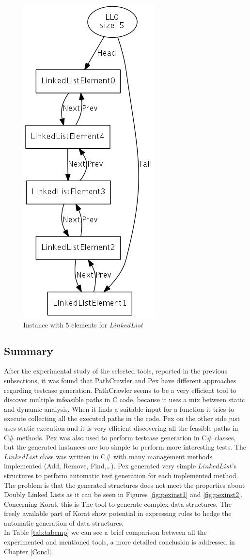 \begin{figure}[!ht]
\center \includegraphics[width=.3\textwidth]{images/ll2}
\caption{Instance with $5$ elements for $LinkedList$}
\label{fig:inst2}
\end{figure}

\subsection{Summary}
After the experimental study of the selected tools, reported in the previous subsections, it was found that PathCrawler and Pex have different
approaches regarding testcase generation. PathCrawler seems to be a very efficient tool to discover multiple
infeasible paths in C code, because it uses a mix between static and dynamic analysis. When it finds a suitable input for a function it tries to execute
collecting all the executed paths in the code.
Pex on the other side just uses static execution and it is very efficient discovering all the feasible paths in C\# methods. Pex was also used
to perform testcase generation in C\# classes, but the generated instances are too simple to perform more interesting tests. The $LinkedList$ class was written
in C\# with many management methods implemented (Add, Remove, Find,\ldots). Pex generated very simple $LinkedList$'s structures to perform automatic test generation
for each implemented method. The problem is that the generated structures does not meet the properties about Doubly Linked Lists as it can be seen in Figures \ref{fig:pexinst1} and \ref{fig:pexinst2}.
Concerning Korat, this is The tool to generate complex data structures. The freely available part of Korat show potential in expressing rules to hedge
the automatic generation of data structures.\\
In Table \ref{tab:tabcmp} we can see a brief comparison between all the experimented and mentioned tools, a more detailed conclusion is addressed in Chapter \ref{Concl}.

